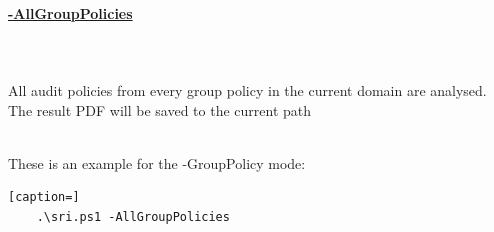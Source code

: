 \begin{tcolorbox}
    \paragraph{\underline{-AllGroupPolicies}} \ \\\\
    All audit policies from every group policy in the current domain are analysed.\\
    The result PDF will be saved to the current path
\end{tcolorbox}\ \\
These is an example for the -GroupPolicy mode: \ \\
\begin{lstlisting}[caption=]
    .\sri.ps1 -AllGroupPolicies
\end{lstlisting}
